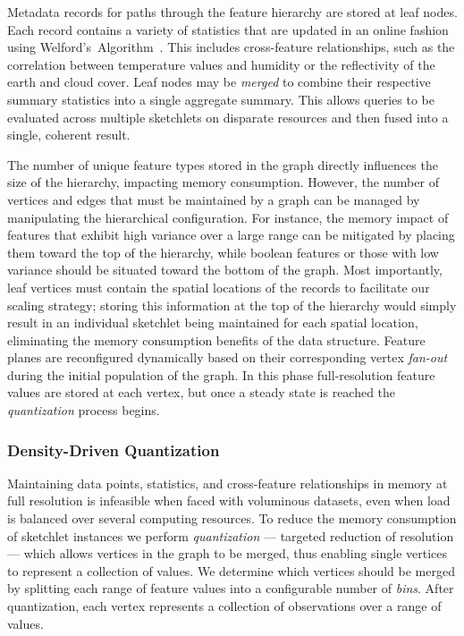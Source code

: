 Metadata records for paths through the feature hierarchy are stored at leaf nodes. Each record contains a variety of statistics that are updated in an online fashion using Welford's~Algorithm~\cite{welford1962note}. This includes cross-feature relationships, such as the correlation between temperature values and humidity or the reflectivity of the earth and cloud cover. Leaf nodes may be \emph{merged} to combine their respective summary statistics into a single aggregate summary. This allows queries to be evaluated across multiple sketchlets on disparate resources and then fused into a single, coherent result.

The number of unique feature types stored in the graph directly influences the size of the hierarchy, impacting memory consumption. However, the number of vertices and edges that must be maintained by a graph can be managed by manipulating the hierarchical configuration. For instance, the memory impact of features that exhibit high variance over a large range can be mitigated by placing them toward the top of the hierarchy, while boolean features or those with low variance should be situated toward the bottom of the graph. Most importantly, leaf vertices must contain the spatial locations of the records to facilitate our scaling strategy; storing this information at the top of the hierarchy would simply result in an individual sketchlet being maintained for each spatial location, eliminating the memory consumption benefits of the data structure. Feature planes are reconfigured dynamically based on their corresponding vertex \emph{fan-out} during the initial population of the graph. In this phase full-resolution feature values are stored at each vertex, but once a steady state is reached the \emph{quantization} process begins.

\subsubsection{Density-Driven Quantization}
Maintaining data points, statistics, and cross-feature relationships in memory at full resolution is infeasible when faced with voluminous datasets, even when load is balanced over several computing resources. To reduce the memory consumption of sketchlet instances we perform \emph{quantization} --- targeted reduction of resolution --- which allows vertices in the graph to be merged, thus enabling single vertices to represent a collection of values. We determine which vertices should be merged by splitting each range of feature values into a configurable number of \emph{bins}. After quantization, each vertex represents a collection of observations over a range of values.

